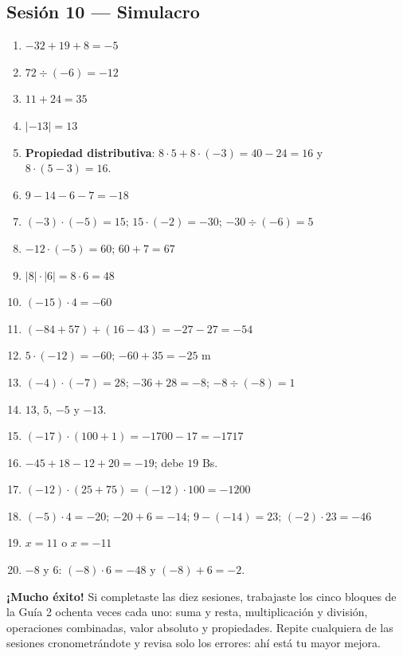 \documentclass[12pt, letterpaper]{article}
\begin{document}
\subsection*{Sesión 10 — Simulacro}
\begin{enumerate}[leftmargin=*, label=\textbf{\arabic*.}]
  \item $-32 + 19 + 8 = -5$
  \item $72 \div (-6) = -12$
  \item $11 + 24 = 35$
  \item $|-13| = 13$
  \item \textbf{Propiedad distributiva}: $8 \cdot 5 + 8 \cdot (-3) = 40 - 24 = 16$ y $8 \cdot (5 - 3) = 16$.
  \item $9 - 14 - 6 - 7 = -18$
  \item $(-3) \cdot (-5) = 15$; $15 \cdot (-2) = -30$; $-30 \div (-6) = 5$
  \item $-12 \cdot (-5) = 60$; $60 + 7 = 67$
  \item $|8| \cdot |6| = 8 \cdot 6 = 48$
  \item $(-15) \cdot 4 = -60$
  \item $(-84 + 57) + (16 - 43) = -27 - 27 = -54$
  \item $5 \cdot (-12) = -60$; $-60 + 35 = -25$ m
  \item $(-4) \cdot (-7) = 28$; $-36 + 28 = -8$; $-8 \div (-8) = 1$
  \item $13$, $5$, $-5$ y $-13$.
  \item $(-17) \cdot (100 + 1) = -1700 - 17 = -1717$
  \item $-45 + 18 - 12 + 20 = -19$; debe $19$ Bs.
  \item $(-12) \cdot (25 + 75) = (-12) \cdot 100 = -1200$
  \item $(-5) \cdot 4 = -20$; $-20 + 6 = -14$; $9 - (-14) = 23$; $(-2) \cdot 23 = -46$
  \item $x = 11$ o $x = -11$
  \item $-8$ y $6$: $(-8) \cdot 6 = -48$ y $(-8) + 6 = -2$.
\end{enumerate}

\vspace{10pt}
\begin{cuadroinfo}
  \small
  \textbf{¡Mucho éxito!} Si completaste las diez sesiones, trabajaste los cinco bloques de la Guía 2 ochenta veces cada uno: suma y resta, multiplicación y división, operaciones combinadas, valor absoluto y propiedades. Repite cualquiera de las sesiones cronometrándote y revisa solo los errores: ahí está tu mayor mejora.
\end{cuadroinfo}

\fi
\end{document}
